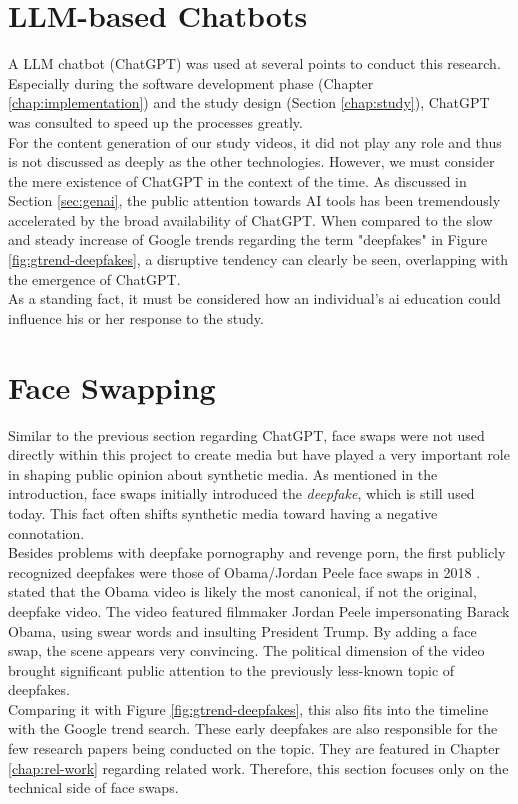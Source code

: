 \documentclass[
  a4paper,  %
  twoside,  %
  bibliography=totoc,
  headsepline,
  cleardoublepage=empty,
  parskip=half,
  draft=false
]{scrbook}
\begin{document}
\section{LLM-based Chatbots}
A LLM chatbot (ChatGPT) was used at several points to conduct this research. Especially during the software development phase (Chapter \ref{chap:implementation}) and the study design (Section \ref{chap:study}), ChatGPT was consulted to speed up the processes greatly. \\ 
For the content generation of our study videos, it did not play any role and thus is not discussed as deeply as the other technologies. However, we must consider the mere existence of ChatGPT in the context of the time. As discussed in Section \ref{sec:genai}, the public attention towards AI tools has been tremendously accelerated by the broad availability of ChatGPT. When compared to the slow and steady increase of Google trends regarding the term "deepfakes" in Figure \ref{fig:gtrend-deepfakes}, a disruptive tendency can clearly be seen, overlapping with the emergence of ChatGPT. \\
As a standing fact, it must be considered how an individual's \gls{ai} education could influence his or her response to the study.

\section{Face Swapping}
\label{sec:face-swapping}
Similar to the previous section regarding ChatGPT, face swaps were not used directly within this project to create media but have played a very important role in shaping public opinion about synthetic media. As mentioned in the introduction, face swaps initially introduced the \textit{deepfake}, which is still used today. This fact often shifts synthetic media toward having a negative connotation. \\
Besides problems with deepfake pornography and revenge porn, the first publicly recognized deepfakes were those of Obama/Jordan Peele face swaps in 2018 \cite{vincentWatchJordanPeele2018}. \citet{hancockSocialImpactDeepfakes2021} stated that the Obama video is likely the most canonical, if not the original, deepfake video. The video featured filmmaker Jordan Peele impersonating Barack Obama, using swear words and insulting President Trump. By adding a face swap, the scene appears very convincing. The political dimension of the video brought significant public attention to the previously less-known topic of deepfakes.\\
Comparing it with Figure \ref{fig:gtrend-deepfakes}, this also fits into the timeline with the Google trend search. These early deepfakes are also responsible for the few research papers being conducted on the topic. They are featured in Chapter \ref{chap:rel-work} regarding related work. Therefore, this section focuses only on the technical side of face swaps.
\end{document}
